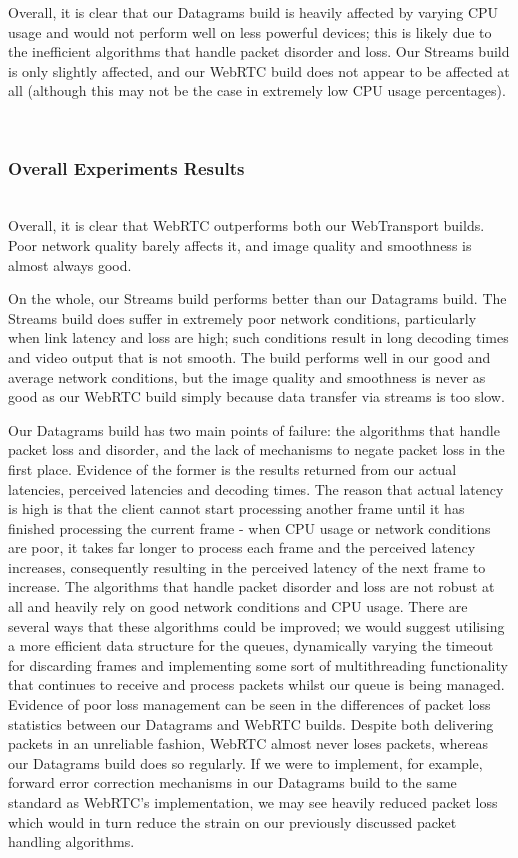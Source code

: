 Overall, it is clear that our Datagrams build is heavily affected by varying CPU usage and would not perform well on less powerful devices; this is likely due to the inefficient algorithms that handle packet disorder and loss. Our Streams build is only slightly affected, and our WebRTC build does not appear to be affected at all (although this may not be the case in extremely low CPU usage percentages).

\hfill{} \\
\subsubsection{Overall Experiments Results} 
\hfill{} \\

Overall, it is clear that WebRTC outperforms both our WebTransport builds. Poor network quality barely affects it, and image quality and smoothness is almost always good. 

On the whole, our Streams build performs better than our Datagrams build. The Streams build does suffer in extremely poor network conditions, particularly when link latency and loss are high; such conditions result in long decoding times and video output that is not smooth. The build performs well in our good and average network conditions, but the image quality and smoothness is never as good as our WebRTC build simply because data transfer via streams is too slow.

Our Datagrams build has two main points of failure: the algorithms that handle packet loss and disorder, and the lack of mechanisms to negate packet loss in the first place. Evidence of the former is the results returned from our actual latencies, perceived latencies and decoding times. The reason that actual latency is high is that the client cannot start processing another frame until it has finished processing the current frame - when CPU usage or network conditions are poor, it takes far longer to process each frame and the perceived latency increases, consequently resulting in the perceived latency of the next frame to increase. The algorithms that handle packet disorder and loss are not robust at all and heavily rely on good network conditions and CPU usage. There are several ways that these algorithms could be improved; we would suggest utilising a more efficient data structure for the queues, dynamically varying the timeout for discarding frames and implementing some sort of multithreading functionality that continues to receive and process packets whilst our queue is being managed.
Evidence of poor loss management can be seen in the differences of packet loss statistics between our Datagrams and WebRTC builds. Despite both delivering packets in an unreliable fashion, WebRTC almost never loses packets, whereas our Datagrams build does so regularly. If we were to implement, for example, forward error correction mechanisms in our Datagrams build to the same standard as WebRTC's implementation, we may see heavily reduced packet loss which would in turn reduce the strain on our previously discussed packet handling algorithms.

